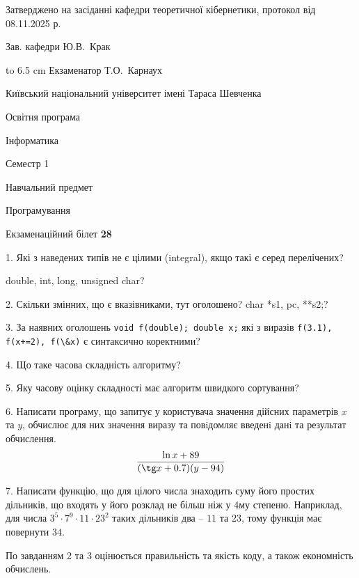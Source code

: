 \documentclass[12pt, ukrainian]{article}
\def\code#1{\Verb!#1!}
\begin{document}
{\smallskip\smallskip \begin {scriptsize} Затверджено на засіданні кафедри теоретичної кібернетики, протокол   від   08.11.2025 р.\par\smallskip\smallskip\smallskip\smallskip
{\parbox {6.5 cm} {Зав. кафедри \dotfill Ю.В.~Крак}}\hspace {0.7cm} {\hbox to 6.5 cm { Екзаменатор \dotfill Т.О.~Карнаух}} \end{scriptsize}}
\vspace{0.9cm}
{{\begin {scriptsize}\par
{ \center  Київський національний університет імені Тараса Шевченка \par}
{\parbox {5 cm}{Освітня програма \hfill}{\parbox {7 cm}{Інформатика\hfill}}\parbox {6 cm}{\hfill Семестр 1}}\par
{\parbox {5 cm} {Навчальний предмет \hfill}\parbox {7 cm}{Програмування \hfill}\parbox {6cm}{\hfill}\par}\vspace{-15pt} \end{scriptsize}}{\center Екзаменаційний білет \No \textbf { 28 }\par}}
{%
1. Які з наведених типів не є цілими (integral), якщо такі є серед перелічених?

double, int, long, unsigned char?
\par
\vspace{2mm}
2. Скільки змінних, що є вказівниками, тут оголошено?
char *s1, pc, **s2;?
\par
\vspace{2mm}
3. За наявних оголошень \code{void f(double); double x;} які з виразів \code{f(3.1), f(x+=2), f(\&x)} є синтаксично коректними?
\par
\vspace{2mm}
4. Що таке часова складність алгоритму?
\par
\vspace{2mm}
5. Яку часову оцінку складності має алгоритм швидкого сортування?
\par
\vspace{2mm}
6. Написати програму, що запитує у користувача значення дійсних параметрів $x$ та $y$, обчислює для них значення виразу та повiдомляє введенi данi та результат обчислення.
$$\frac{\ln x + 89}{(\tg x + 0.7) (y - 94)}$$ 

\par
7. Написати функцію, що для цілого числа знаходить суму його простих дільників, що входять у його розклад не більш ніж у 4му степеню. Наприклад, для числа $3^5{\cdot}7^9{\cdot}11{\cdot}23^{2}$ таких дільників два – $11$ та $23$, тому функція має повернути $34$.

По завданням 2 та 3 оцінюється правильність та якість коду, а також економність обчислень.

}
\end{document}
